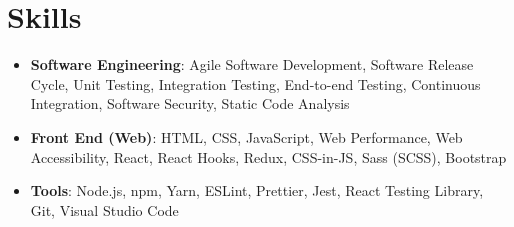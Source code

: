 \documentclass[letterpaper,11pt]{article}
\newcommand{\resumeSubHeadingListStart}{\begin{itemize}[leftmargin=*]}
\newcommand{\resumeSubHeadingListEnd}{\end{itemize}}
\begin{document}



\section{Skills}
  \resumeSubHeadingListStart
    \item{
      \textbf{Software Engineering}{: Agile Software Development, Software Release Cycle, Unit Testing, Integration Testing, End-to-end Testing, Continuous Integration, Software Security, Static Code Analysis}
    }
    \item{
      \textbf{Front End (Web)}{: HTML, CSS, JavaScript, Web Performance, Web Accessibility, React, React Hooks, Redux, CSS-in-JS, Sass (SCSS), Bootstrap}
    }
    \item{
      \textbf{Tools}{: Node.js, npm, Yarn, ESLint, Prettier, Jest, React Testing Library, Git, Visual Studio Code}
    }
  \resumeSubHeadingListEnd





\end{document}
